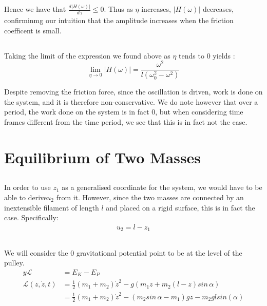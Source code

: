 \documentclass{article}
\begin{document}
Hence we have that $\frac{d\left|H(\omega)\right|}{d\gamma} \le 0$.
Thus as $\eta$ increases, $\left|H(\omega)\right|$ decreases, confirminmg our intuition that the amplitude increases when the friction coefficent is small.

\subsection{} %

Taking the limit of the expression we found above as $\eta$ tends to 0 yields :
$$\lim_{\eta \to 0}\left|H(\omega)\right| = \frac{\omega^2}{l(\omega_0^2-\omega^2)} $$

Despite removing the friction force, since the oscillation is driven, work is done on the system, and it is therefore non-conservative. We do note however that over a period, the work done on the system is in fact 0, but when considering time frames different from the time period, we see that this is in fact not the case.

\section{Equilibrium of Two Masses}

\subsection{} %

In order to use $z_1$ as a generalised coordinate for the system, we would have to be able to derive$u_2$ from it. However, since the two masses are connected by an inextensible filament of length $l$ and placed on a rigid surface, this is in fact the case. Specifically:
\begin{align*}
	u_2 = l - z_1
\end{align*}

\subsection{} %

We will consider the 0 gravitational potential point to be at the level of the pulley.
\begin{align*}y
	\mathcal{L} &= E_{K} - E_P\\
	\mathcal{L}(z,\dot{z},t) &= \frac{1}{2}(m_1+m_2)\dot{z}^2 - g(m_1z + m_2(l-z)sin\,\alpha)\\
	&= \frac{1}{2}(m_1+m_2)\dot{z}^2 - (m_2sin\,\alpha - m_1)g z - m_2 g l sin(\alpha)
\end{align*}
\end{document}
